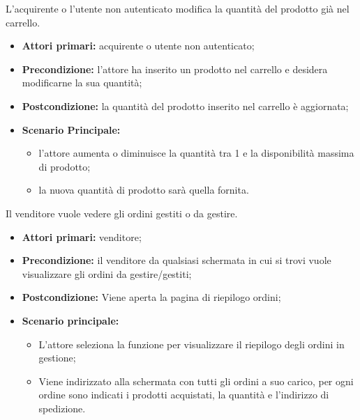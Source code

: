 
L'acquirente o l'utente non autenticato modifica la quantità del prodotto già nel carrello.
\begin{itemize}
    \item \textbf{Attori primari:} acquirente o utente non autenticato;
    \item \textbf{Precondizione:} l'attore ha inserito un prodotto nel carrello e desidera modificarne la sua quantità;
    \item \textbf{Postcondizione:} la quantità del prodotto inserito nel carrello è aggiornata;
    \item \textbf{Scenario Principale:}
        \begin{itemize}
            \item l'attore aumenta o diminuisce la quantità tra 1 e la disponibilità massima di prodotto;
            \item la nuova quantità di prodotto sarà quella fornita.
        \end{itemize}
\end{itemize}


Il venditore vuole vedere gli ordini gestiti o da gestire.
\begin{itemize}
    \item \textbf{Attori primari:} venditore;
    \item \textbf{Precondizione:} il venditore da qualsiasi schermata in cui si trovi vuole visualizzare gli ordini da gestire/gestiti;
    \item \textbf{Postcondizione:} Viene aperta la pagina di riepilogo ordini;
    \item \textbf{Scenario principale:}
    \begin{itemize}
        \item L'attore seleziona la funzione per visualizzare il riepilogo degli ordini in gestione;
        \item Viene indirizzato alla schermata con tutti gli ordini a suo carico, per ogni ordine sono indicati i prodotti acquistati, la quantità e l'indirizzo di spedizione.
    \end{itemize}
\end{itemize}
